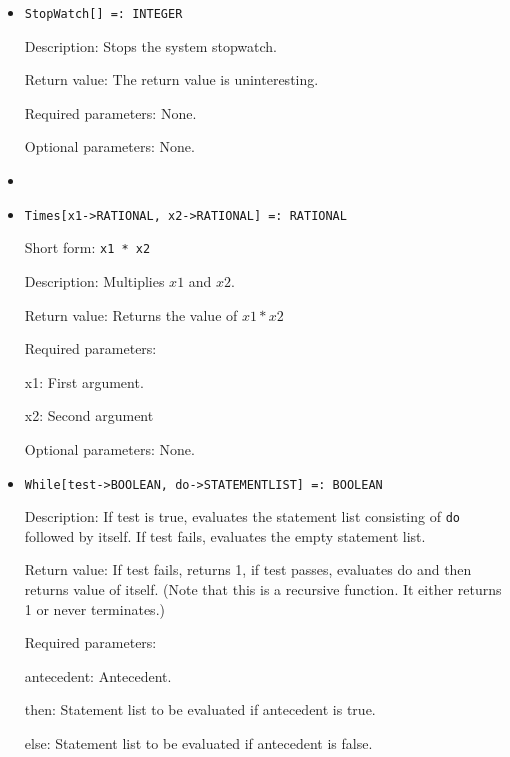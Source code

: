 \begin{itemize}
\item
\protect \large \begin{verbatim}
StopWatch[] =: INTEGER
\end{verbatim}\normalsize

\bd
\item
[Description:] Stops the system stopwatch.
\item
[Return value:] The return value is uninteresting.
\item
[Required parameters:] None.
\item
[Optional parameters:] None.
\ed

\item

\item 
\protect \large \begin{verbatim}
Times[x1->RATIONAL, x2->RATIONAL] =: RATIONAL
\end{verbatim} \normalsize
  
\bd
\item
[Short form:] \verb+x1 * x2+
\item
[Description:] Multiplies $x1$ and $x2$.
\item
[Return value:] Returns the value of $x1 * x2$  
\item
[Required parameters:]\hfil\null
\bd
\item
[x1:] First argument.  
\item
[x2:] Second argument
\ed
\item
[Optional parameters:] None.
\ed

\item 
\protect \large \begin{verbatim}
While[test->BOOLEAN, do->STATEMENTLIST] =: BOOLEAN
\end{verbatim} \normalsize
  
\bd
\item
[Description:] If test is true, evaluates the statement list consisting of
\verb+do+ followed by itself.  If test fails, evaluates the empty
statement list.
\item
[Return value:] If test fails, returns 1, if test passes, evaluates do and
then returns value of itself.  (Note that this is a recursive function.
It either returns 1 or never terminates.)

\item
[Required parameters:]\hfil\null
\bd
\item
[antecedent:] Antecedent.  
\item
[then:] Statement list to be evaluated if antecedent is true. 
\ed
\item
[else:] Statement list to be evaluated if antecedent is false. 
\ed




\end{itemize}
